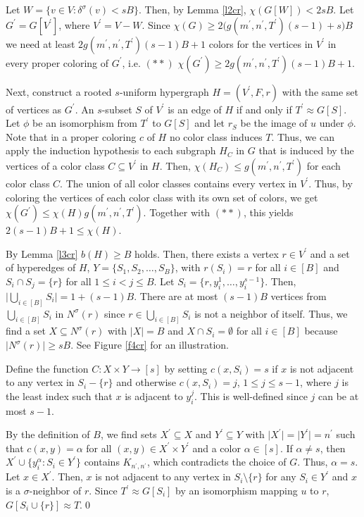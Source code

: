 \begin{prf}
Let $W=\{v\in V:\delta^\sigma (v) <sB\}$. Then, by Lemma \ref{l2cr}, $\chi (G[W]) < 2sB$. Let $G^\prime = G[V^\prime ]$, where $V^\prime = V-W$. Since $\chi (G)\geq 2\big( g(m^\prime ,n^\prime ,T^\prime )(s-1)+s\big) B$ we need at least $2g(m^\prime ,n^\prime ,T^\prime )(s-1)B + 1$ colors for the vertices in $V^\prime$ in every proper coloring of $G^\prime$, i.e. $(\ast\ast)$ $\chi (G^\prime )\geq 2g(m^\prime ,n^\prime ,T^\prime )(s-1)B + 1$.

Next, construct a rooted $s$-uniform hypergraph $H=(V^\prime ,F,r)$ with the same set of vertices as $G^\prime$. An $s$-subset $S$ of $V^\prime$ is an edge of $H$ if and only if $T^\prime\approx G[S]$. Let $\phi$ be an isomorphism from $T^\prime$ to $G[S]$ and let $r_S$ be the image of $u$ under $\phi$. Note that in a proper coloring $c$ of $H$ no color class induces $T$. Thus, we can apply the induction hypothesis to each subgraph $H_C$ in $G$ that is induced by the vertices of a color class $C\subseteq V^\prime$ in $H$. Then, $\chi (H_C)\leq g(m^\prime , n^\prime , T^\prime )$ for each color class $C$. The union of all color classes contains every vertex in $V^\prime$. Thus, by coloring the vertices of each color class with its own set of colors, we get $\chi (G^\prime )\leq \chi (H)g(m^\prime ,n^\prime ,T^\prime )$. Together with $(\ast\ast)$, this yields $2(s-1)B +1\leq \chi (H)$.

By Lemma \ref{l3cr} $b(H)\geq B$ holds. Then, there exists a vertex $r\in V^\prime$ and a set of hyperedges of $H$, $Y = \{S_1,S_2,\dots ,S_B\}$, with $r(S_i)=r$ for all $i\in [B]$ and $S_i\cap S_j=\{r\}$ for all $1\leq i<j\leq B$. Let $S_i=\{r,y_i^1,\dots ,y_i^{s-1}\}$. Then, $\vert \bigcup_{i\in [B]} S_i\vert =1 +(s-1)B$. There are at most $(s-1)B$ vertices from $\bigcup_{i\in [B]} S_i$ in $N^\sigma (r)$ since $r\in \bigcup_{i\in [B]} S_i$ is not a neighbor of itself. Thus, we find a set $X\subseteq N^\sigma (r)$ with $\vert X\vert =B$ and $X\cap S_i =\emptyset$ for all $i\in [B]$ because $\vert N^\sigma (r)\vert\geq sB$. See Figure \ref{f4cr} for an illustration. 

Define the function $C:X\times Y\to [s]$ by setting $c(x,S_i)=s$ if $x$ is not adjacent to any vertex in $S_i-\{r\}$ and otherwise $c(x,S_i)=j$, $1\leq j\leq s-1$, where $j$ is the least index such that $x$ is adjacent to $y_i^j$. This is well-defined since $j$ can be at most $s-1$.

By the definition of $B$, we find sets $X^\prime\subseteq X$ and $Y^\prime\subseteq Y$ with $\vert X^\prime\vert = \vert Y^\prime\vert =n^\prime$ such that $c(x,y)=\alpha$ for all $(x,y)\in X^\prime\times Y^\prime$ and a color $\alpha\in [s]$. If $\alpha\neq s$, then $X^\prime\cup\{y_i^\alpha :S_i\in Y^\prime\}$ contains $K_{n^\prime ,n^\prime}$, which contradicts the choice of $G$. Thus, $\alpha = s$. Let $x\in X^\prime$. Then, $x$ is not adjacent to any vertex in $S_i \setminus \{r\}$ for any $S_i\in Y^\prime$ and $x$ is a $\sigma$-neighbor of $r$. Since $T^\prime\approx G[S_i]$ by an isomorphism mapping $u$ to $r$, $G[S_i\cup\{r\}]\approx T$.\qed
\end{prf}

